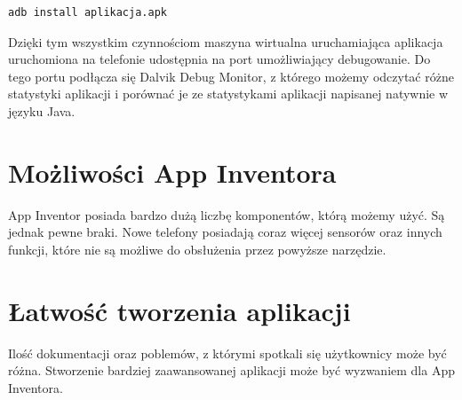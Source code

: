 \begin{lstlisting}
adb install aplikacja.apk
\end{lstlisting}

Dzięki tym wszystkim czynnościom maszyna wirtualna uruchamiająca aplikacja uruchomiona na telefonie udostępnia na port umożliwiający debugowanie. Do tego portu podłącza się Dalvik Debug Monitor, z którego możemy odczytać różne statystyki aplikacji i porównać je ze statystykami aplikacji napisanej natywnie w języku Java.

\section{Możliwości App Inventora}

App Inventor posiada bardzo dużą liczbę komponentów, którą możemy użyć. Są jednak pewne braki. Nowe telefony posiadają coraz więcej sensorów oraz innych funkcji, które nie są możliwe do obsłużenia przez powyższe narzędzie.

\section{Łatwość tworzenia aplikacji}

Ilość dokumentacji oraz poblemów, z którymi spotkali się użytkownicy może być różna. Stworzenie bardziej zaawansowanej aplikacji może być wyzwaniem dla App Inventora.

